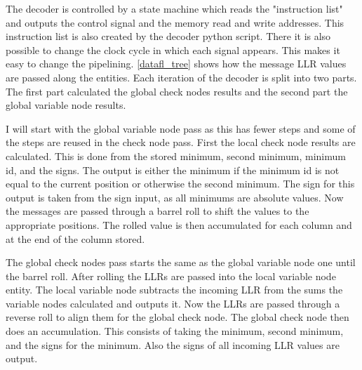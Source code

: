 The decoder is controlled by a state machine which reads the "instruction list" and outputs the control signal and the memory read and write addresses. This instruction list is also created by the decoder python script. There it is also possible to change the clock cycle in which each signal appears. This makes it easy to change the pipelining. \cref{datafl_tree} shows how the message LLR values are passed along the entities. Each iteration of the decoder is split into two parts. The first part calculated the global check nodes results and the second part the global variable node results.

I will start with the global variable node pass as this has fewer steps and some of the steps are reused in the check node pass. First the local check node results are calculated. This is done from the stored minimum, second minimum, minimum id, and the signs. The output is either the minimum if the minimum id is not equal to the current position or otherwise the second minimum. The sign for this output is taken from the sign input, as all minimums are absolute values. Now the messages are passed through a barrel roll to shift the values to the appropriate positions. The rolled value is then accumulated for each column and at the end of the column stored. 

The global check nodes pass starts the same as the global variable node one until the barrel roll. After rolling the LLRs are passed into the local variable node entity. The local variable node subtracts the incoming LLR from the sums the variable nodes calculated and outputs it. Now the LLRs are passed through a reverse roll to align them for the global check node. The global check node then does an accumulation. This consists of taking the minimum, second minimum, and the signs for the minimum. Also the signs of all incoming LLR values are output.

